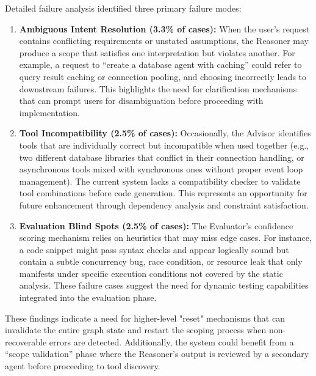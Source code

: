 \documentclass[lettersize,journal]{IEEEtran}
\begin{document}
Detailed failure analysis identified three primary failure modes:
\begin{enumerate}
    \item \textbf{Ambiguous Intent Resolution (3.3\% of cases):} When the user's request contains conflicting requirements or unstated assumptions, the Reasoner may produce a scope that satisfies one interpretation but violates another. For example, a request to ``create a database agent with caching'' could refer to query result caching or connection pooling, and choosing incorrectly leads to downstream failures. This highlights the need for clarification mechanisms that can prompt users for disambiguation before proceeding with implementation.
    \item \textbf{Tool Incompatibility (2.5\% of cases):} Occasionally, the Advisor identifies tools that are individually correct but incompatible when used together (e.g., two different database libraries that conflict in their connection handling, or asynchronous tools mixed with synchronous ones without proper event loop management). The current system lacks a compatibility checker to validate tool combinations before code generation. This represents an opportunity for future enhancement through dependency analysis and constraint satisfaction.
    \item \textbf{Evaluation Blind Spots (2.5\% of cases):} The Evaluator's confidence scoring mechanism relies on heuristics that may miss edge cases. For instance, a code snippet might pass syntax checks and appear logically sound but contain a subtle concurrency bug, race condition, or resource leak that only manifests under specific execution conditions not covered by the static analysis. These failure cases suggest the need for dynamic testing capabilities integrated into the evaluation phase.
\end{enumerate}

These findings indicate a need for higher-level "reset" mechanisms that can invalidate the entire graph state and restart the scoping process when non-recoverable errors are detected. Additionally, the system could benefit from a ``scope validation'' phase where the Reasoner's output is reviewed by a secondary agent before proceeding to tool discovery.
\end{document}
